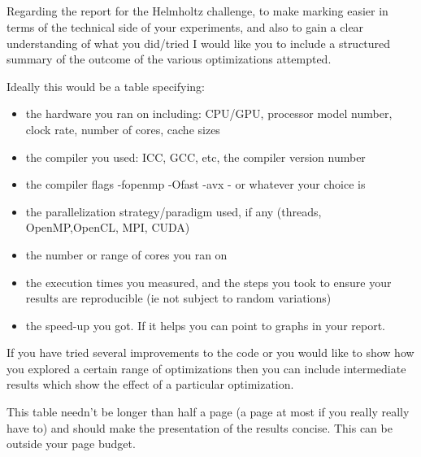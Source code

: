 \documentclass[11pt, oneside, a4paper]{article}
\begin{document}
\subsection{} %
\label{sub:}


Regarding the report for the Helmholtz challenge, to make marking easier in terms of the technical side of your experiments, and also to gain a clear understanding of what you did/tried I would like you to include a structured summary of the outcome of the various optimizations attempted.

Ideally this would be a table specifying:
\begin{itemize}
\item  the hardware you ran on including: CPU/GPU, processor model number, clock rate, number of cores, cache sizes
\item  the compiler you used: ICC, GCC, etc, the compiler version number
\item  the compiler flags -fopenmp -Ofast -avx  - or whatever your choice is
\item  the parallelization strategy/paradigm used, if any (threads, OpenMP,OpenCL, MPI, CUDA)
\item  the number or range of cores you ran on
\item  the execution times you measured, and the steps you took to ensure your results are reproducible (ie not subject to random variations)
\item  the speed-up you got. If it helps you can point to graphs in your report.
\end{itemize}
If you have tried several improvements to the code or you would like to show how you explored a certain range of optimizations then you can include intermediate results which show the effect of a particular optimization.

This table needn't be longer than half a page (a page at most if you really really have to) and should make the presentation of the results concise.  This can be outside your page budget.

\end{document}
